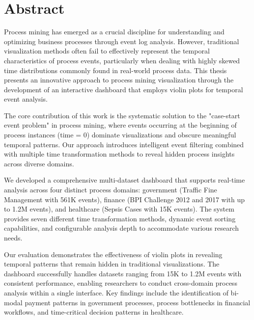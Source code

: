 
\chapter*{Abstract}

Process mining has emerged as a crucial discipline for understanding and optimizing business processes through event log analysis. However, traditional visualization methods often fail to effectively represent the temporal characteristics of process events, particularly when dealing with highly skewed time distributions commonly found in real-world process data. This thesis presents an innovative approach to process mining visualization through the development of an interactive dashboard that employs violin plots for temporal event analysis.

The core contribution of this work is the systematic solution to the "case-start event problem" in process mining, where events occurring at the beginning of process instances (time = 0) dominate visualizations and obscure meaningful temporal patterns. Our approach introduces intelligent event filtering combined with multiple time transformation methods to reveal hidden process insights across diverse domains.

We developed a comprehensive multi-dataset dashboard that supports real-time analysis across four distinct process domains: government (Traffic Fine Management with 561K events), finance (BPI Challenge 2012 and 2017 with up to 1.2M events), and healthcare (Sepsis Cases with 15K events). The system provides seven different time transformation methods, dynamic event sorting capabilities, and configurable analysis depth to accommodate various research needs.

Our evaluation demonstrates the effectiveness of violin plots in revealing temporal patterns that remain hidden in traditional visualizations. The dashboard successfully handles datasets ranging from 15K to 1.2M events with consistent performance, enabling researchers to conduct cross-domain process analysis within a single interface. Key findings include the identification of bi-modal payment patterns in government processes, process bottlenecks in financial workflows, and time-critical decision patterns in healthcare.

